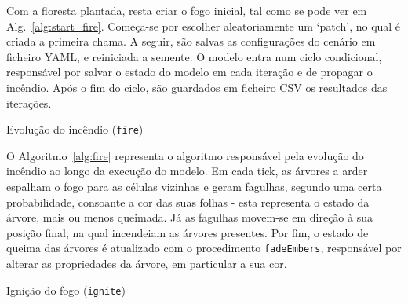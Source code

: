 Com a floresta plantada, resta criar o fogo inicial, tal como se pode ver em Alg.~\ref{alg:start_fire}.
Começa-se por escolher aleatoriamente um ‘patch’, no qual é criada a primeira chama.
A seguir, são salvas as configurações do cenário em ficheiro YAML, e reiniciada a semente.
O modelo entra num ciclo condicional, responsável por salvar o estado do modelo em cada iteração e de propagar o incêndio.
Após o fim do ciclo, são guardados em ficheiro CSV os resultados das iterações.


\begin{algorithm}
    \caption{Evolução do incêndio (\texttt{fire})}\label{alg:fire}
    \fadeEmbers{}\;
    \tick{}\;
\end{algorithm}

O Algoritmo~\ref{alg:fire} representa o algoritmo responsável pela evolução do incêndio ao longo da execução do modelo.
Em cada tick, as árvores a arder espalham o fogo para as células vizinhas e geram fagulhas, segundo uma certa probabilidade, consoante a cor das suas folhas - esta representa o estado da árvore, mais ou menos queimada.
Já as fagulhas movem-se em direção à sua posição final, na qual incendeiam as árvores presentes.
Por fim, o estado de queima das árvores é atualizado com o procedimento \texttt{fadeEmbers}, responsável por alterar as propriedades da árvore, em particular a sua cor.

\begin{algorithm}
    \caption{Ignição do fogo (\texttt{ignite})}\label{alg:ignite}
    \;
\end{algorithm}

